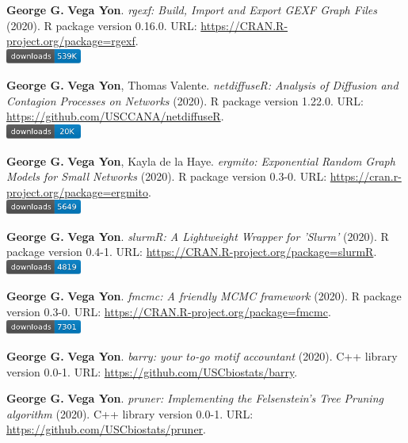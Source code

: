 \item \textbf{George G.} \textbf{Vega Yon}. \textit{rgexf: Build, Import and Export GEXF Graph Files} (2020). R package version 0.16.0. {\small URL}: \url{https://CRAN.R-project.org/package=rgexf}. \\\includegraphics[width=2.5cm]{fig/cran-downloads-rgexf.pdf} 
\item \textbf{George G.} \textbf{Vega Yon}, Thomas Valente. \textit{{{netdiffuseR: Analysis of Diffusion and Contagion Processes on Networks}}} (2020). R package version 1.22.0. {\small URL}: \url{https://github.com/USCCANA/netdiffuseR}. \\\includegraphics[width=2.5cm]{fig/cran-downloads-netdiffuser.pdf} 
\item \textbf{George G.} \textbf{Vega Yon}, Kayla de la Haye. \textit{ergmito: Exponential Random Graph Models for Small Networks} (2020). R package version 0.3-0. {\small URL}: \url{https://cran.r-project.org/package=ergmito}. \\\includegraphics[width=2.5cm]{fig/cran-downloads-ergmito.pdf} 
\item \textbf{George G.} \textbf{Vega Yon}. \textit{slurmR: A Lightweight Wrapper for 'Slurm'} (2020). R package version 0.4-1. {\small URL}: \url{https://CRAN.R-project.org/package=slurmR}. \\\includegraphics[width=2.5cm]{fig/cran-downloads-slurmr.pdf} 
\item \textbf{George G.} \textbf{Vega Yon}. \textit{fmcmc: A friendly MCMC framework} (2020). R package version 0.3-0. {\small URL}: \url{https://CRAN.R-project.org/package=fmcmc}. \\\includegraphics[width=2.5cm]{fig/cran-downloads-fmcmc.pdf} 
\item \textbf{George G.} \textbf{Vega Yon}. \textit{barry: your to-go motif accountant} (2020). C++ library version 0.0-1. {\small URL}: \url{https://github.com/USCbiostats/barry}.  
\item \textbf{George G.} \textbf{Vega Yon}. \textit{pruner: Implementing the Felsenstein's Tree Pruning algorithm} (2020). C++ library version 0.0-1. {\small URL}: \url{https://github.com/USCbiostats/pruner}.  
